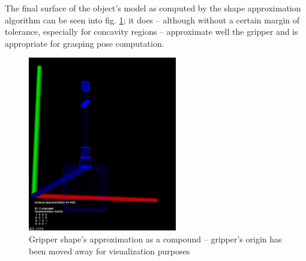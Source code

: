 The final surface of the object's model as computed by the shape approximation
algorithm can be seen into fig. \ref{fig:approximation-of-gripper}; it does --
although without a certain margin of tolerance, especially for concavity
regions -- approximate well the gripper and is appropriate for grasping pose
computation.

\begin{figure}[htbp] \label{fig:approximation-of-gripper}
\centering
\includegraphics[height=3in]{./Results/Gripper_approx}
\caption{Gripper shape's approximation as a compound -- gripper's origin has
been moved away for visualization purposes}
\end{figure}


